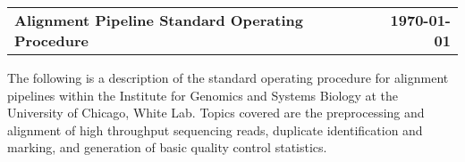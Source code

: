 \documentclass[letterpaper,11pt]{article}
\begin{document}
  \begin{tabular}{ l r }
    \textbf{\Large Alignment Pipeline Standard Operating Procedure} & \textbf{\today} \\
  \end{tabular}

  \vspace{\vspacepts}
  The following is a description of the standard operating procedure for alignment
  pipelines within the Institute for Genomics and Systems Biology at the University
  of Chicago, White Lab. Topics covered are the preprocessing and alignment of high
  throughput sequencing reads, duplicate identification and marking, and generation
  of basic quality control statistics.
  
  \pagebreak
  
  \pagebreak
  
  \pagebreak
  
  \pagebreak
  
  \pagebreak
  
\end{document}
